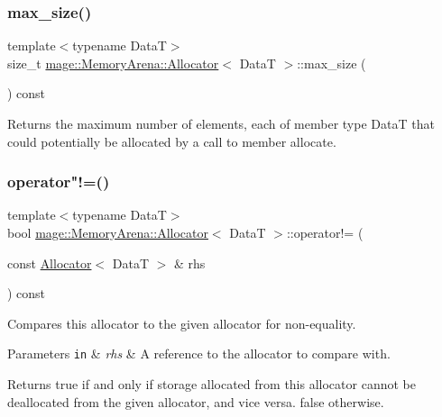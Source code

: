 \subsubsection{\texorpdfstring{max\+\_\+size()}{max\_size()}}
{\footnotesize\ttfamily template$<$typename DataT$>$ \\
size\+\_\+t \hyperlink{structmage_1_1_memory_arena_1_1_allocator}{mage\+::\+Memory\+Arena\+::\+Allocator}$<$ DataT $>$\+::max\+\_\+size (\begin{DoxyParamCaption}{ }\end{DoxyParamCaption}) const\hspace{0.3cm}{\ttfamily [noexcept]}}

Returns the maximum number of elements, each of member type {\ttfamily DataT} that could potentially be allocated by a call to member allocate. \hypertarget{structmage_1_1_memory_arena_1_1_allocator_a2fa34993d2d65722e5bc2db1ed4c3536}{}\label{structmage_1_1_memory_arena_1_1_allocator_a2fa34993d2d65722e5bc2db1ed4c3536} 
\subsubsection{\texorpdfstring{operator"!=()}{operator!=()}}
{\footnotesize\ttfamily template$<$typename DataT$>$ \\
bool \hyperlink{structmage_1_1_memory_arena_1_1_allocator}{mage\+::\+Memory\+Arena\+::\+Allocator}$<$ DataT $>$\+::operator!= (\begin{DoxyParamCaption}\item[{const \hyperlink{structmage_1_1_memory_arena_1_1_allocator}{Allocator}$<$ DataT $>$ \&}]{rhs }\end{DoxyParamCaption}) const\hspace{0.3cm}{\ttfamily [noexcept]}}

Compares this allocator to the given allocator for non-\/equality.


\begin{DoxyParams}[1]{Parameters}
\mbox{\tt in}  & {\em rhs} & A reference to the allocator to compare with. \\
\hline
\end{DoxyParams}
\begin{DoxyReturn}{Returns}
{\ttfamily true} if and only if storage allocated from this allocator cannot be deallocated from the given allocator, and vice versa. {\ttfamily false} otherwise. 
\end{DoxyReturn}
\hypertarget{structmage_1_1_memory_arena_1_1_allocator_a4d05273b71981e73fc561c54d6006a1d}{}\label{structmage_1_1_memory_arena_1_1_allocator_a4d05273b71981e73fc561c54d6006a1d} 
